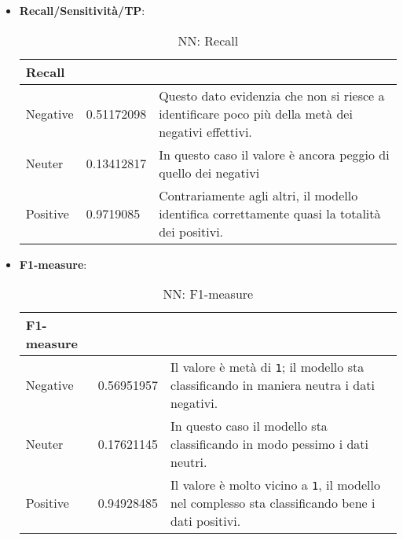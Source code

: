 \begin{itemize}
				\item \textbf{Recall/Sensitività/TP}:
				
				\begin{table} [H]
					\caption{NN: Recall}
					\label{tab:RecallNN}
					\centering
					\begin{tabular}{llp{}}
						\toprule 
						\textbf{Recall}	\\
						\midrule
						Negative  & 0.51172098  & Questo dato evidenzia che non si riesce a identificare poco più della metà dei negativi effettivi.\\
						Neuter & 0.13412817 & In questo caso il valore è ancora peggio di quello dei negativi\\
						Positive & 0.9719085 & Contrariamente agli altri, il modello identifica correttamente quasi la totalità dei positivi.\\
						\bottomrule
					\end{tabular}
				\end{table}
				\item \textbf{F1-measure}:
				
				\begin{table} [H]
					\caption{NN: F1-measure}
					\label{tab:F1-measureNN}
					\centering
					\begin{tabular}{llp{}}
						\toprule 
						\textbf{F1-measure}	\\
						\midrule
						Negative  & 0.56951957  & Il valore è metà di \verb|1|; il modello sta classificando in maniera neutra i dati negativi.\\
						Neuter & 0.17621145 & In questo caso il modello sta classificando in modo pessimo i dati neutri.\\
						Positive & 0.94928485 & Il valore è molto vicino a \verb|1|, il modello nel complesso sta classificando bene i dati positivi.\\
						\bottomrule
					\end{tabular}
				\end{table}
		\end{itemize}
	


%								
%							
							
							
